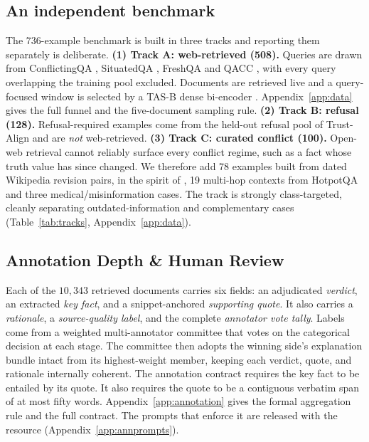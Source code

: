 \subsection{An independent benchmark}

The 736-example benchmark is built in three tracks and reporting them
separately is deliberate. \textbf{(1) Track A: web-retrieved (508).} Queries are drawn from ConflictingQA
\citep{wan2024evidencelanguagemodelsconvincing}, SituatedQA
\citep{zhang2021situatedqaincorporatingextralinguisticcontexts}, FreshQA
\citep{vu2024freshllms} and QACC \citep{liu2025opendomainquestionanswering}, with
every query overlapping the training pool excluded. Documents are retrieved live
and a query-focused window is selected by a TAS-B dense bi-encoder
\citep{hofstatter2021tasb}. Appendix~\ref{app:data} gives the full funnel and the
five-document sampling rule. \textbf{(2) Track B: refusal (128).} Refusal-required examples come from the
held-out refusal pool of Trust-Align \citep{song2025trustalign} and are
\emph{not} web-retrieved. \textbf{(3) Track C: curated conflict (100).} Open-web
retrieval cannot reliably surface every conflict regime, such as a fact whose
truth value has since changed. We therefore add 78 examples built from
dated Wikipedia revision pairs, in the spirit of \citet{hou2024wikicontradict},
19 multi-hop contexts from HotpotQA \citep{yang2018hotpotqa} and three
medical/misinformation cases. The track is strongly class-targeted, cleanly
separating outdated-information and complementary cases
(Table~\ref{tab:tracks}, Appendix~\ref{app:data}).

\subsection{Annotation Depth \& Human Review}

Each of the $10{,}343$ retrieved documents carries six fields: an adjudicated
\textit{verdict}, an extracted \textit{key fact}, and a snippet-anchored
\textit{supporting quote}. It also carries a \textit{rationale}, a
\textit{source-quality label}, and the complete \textit{annotator vote tally}.
Labels come from a weighted multi-annotator committee that votes on the
categorical decision at each stage. The committee then adopts the winning
side's explanation bundle intact from its highest-weight member, keeping each
verdict, quote, and rationale internally coherent. The annotation contract
requires the key fact to be entailed by its quote. It also requires the quote
to be a contiguous verbatim span of at most fifty words. Appendix~\ref{app:annotation}
gives the formal aggregation rule and the full contract. The prompts that
enforce it are released with the resource (Appendix~\ref{app:annprompts}).

